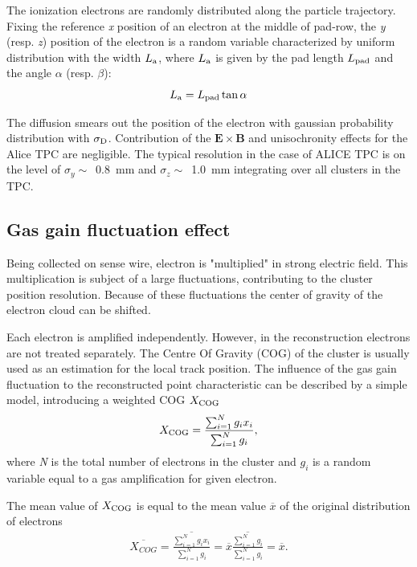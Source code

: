 \documentclass[a4paper,12pt]{article}
\begin{document}
The ionization electrons are randomly distributed along the
particle trajectory. Fixing the reference {\it{x}} position of an
electron at the middle of pad-row, the {\it{y}} (resp. {\it{z}})
position of the electron is a random variable characterized by
uniform distribution with the width $L_{\rm{a}}$, where
$L_{\rm{a}}$ is given by the pad length $L_{\rm{pad}}$ and the
angle $\alpha$ (resp. $\beta$):
\[L_{\rm{a}}=L_{\rm{pad}}\tan\alpha\]

The diffusion smears out the position of the electron with
gaussian probability distribution with $\sigma_{\rm{D}}$.
Contribution of the $\mathbf{E{\times}B}$ and unisochronity
effects for the  Alice TPC are negligible. The typical resolution
in the case of ALICE TPC is on the level of
$\sigma_{y}\sim$~0.8~mm and $\sigma_{z}\sim$~1.0~mm integrating
over all clusters in the TPC.



\subsection{Gas gain fluctuation effect}

Being collected on sense wire, electron is "multiplied" in strong
electric field. This multiplication is subject of a large
fluctuations, contributing to the cluster position resolution.
Because of these fluctuations the center of gravity of the
electron cloud can be shifted.

Each electron is amplified independently. However, in the
reconstruction electrons are not treated separately. The Centre Of
Gravity  (COG) of the cluster is usually used as an estimation for
the local track position. The influence of the gas gain
fluctuation to the reconstructed point characteristic can be
described by a simple model, introducing a weighted COG
$X_{\rm{COG}}$
\begin{eqnarray}
    X_{\rm{COG}}=\frac{\sum_{i=1}^{N}{g_ix_i}}{\sum_{i=1}^N{g_i}},
\label{eqCOGdefGG}
\end{eqnarray}
where {\it{N}} is the total number of electrons in the cluster and
$g_i$ is a random variable equal to a gas amplification for given
electron.

The mean value of $X_{\rm{COG}}$ is equal to the mean value
$\overline{x}$ of the original distribution of electrons
\begin{eqnarray}
      \overline{X_{COG}}=
    \overline{\frac{\sum_{i=1}^{N}{g_ix_i}}{\sum_{i=1}^N{g_i}}}
    =\overline{x}\overline{\frac{\sum_{i=1}^{N}{g_i}}
    {\sum_{i=1}^N{g_i}}} =\overline{x}.
\label{eqCOGMeanGG}
\end{eqnarray}
\end{document}
